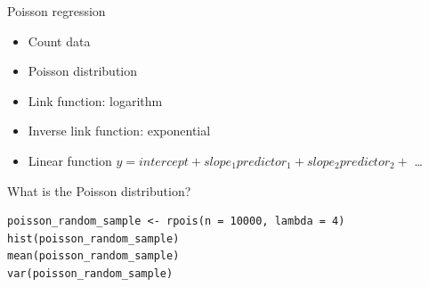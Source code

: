 \documentclass[10pt]{beamer}
\makeatletter
\newenvironment{kframe}{%
 \def\at@end@of@kframe{}%
 \ifinner\ifhmode%
  \def\at@end@of@kframe{\end{minipage}}%
  \begin{minipage}{\columnwidth}%
 \fi\fi%
 \def\FrameCommand##1{\hskip\@totalleftmargin \hskip-\fboxsep
 \colorbox{shadecolor}{##1}\hskip-\fboxsep
     \hskip-\linewidth \hskip-\@totalleftmargin \hskip\columnwidth}%
 \MakeFramed {\advance\hsize-\width
   \@totalleftmargin\z@ \linewidth\hsize
   \@setminipage}}%
 {\par\unskip\endMakeFramed%
 \at@end@of@kframe}
\newenvironment{knitrout}{}{} %
\makeatother
\begin{document}
\begin{frame}{Poisson regression}
  \begin{itemize}
    \item Count data
    \item Poisson distribution
    \item Link function: logarithm
    \item Inverse link function: exponential
    \item Linear function $y = intercept + slope_1 predictor_1 + slope_2 predictor_2 +$ \dots
  \end{itemize}
\end{frame}


\begin{frame}[fragile]{What is the Poisson distribution?}

    
\begin{knitrout}
\color{fgcolor}\begin{kframe}
\begin{verbatim}
poisson_random_sample <- rpois(n = 10000, lambda = 4)  
hist(poisson_random_sample)
mean(poisson_random_sample)
var(poisson_random_sample)
\end{verbatim}
\end{kframe}
\end{knitrout}

\end{frame}
\end{document}
